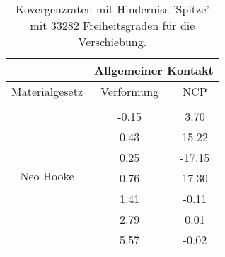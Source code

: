 \begin{table} 
\centering 
\begin{tabular}{c|cc|} 
\cline{2-3} 
 & \multicolumn{2}{|c|}{Allgemeiner Kontakt} \\ 
\hline 
\multicolumn{1}{|c|}{Materialgesetz} & \multicolumn{1}{c|}{Verformung} & \multicolumn{1}{c|}{NCP} \\ 
\hline 
\multicolumn{1}{|c|}{\multirow{8}{*}{Neo Hooke}} &\multicolumn{1}{|c|}{} & \multicolumn{1}{|c|}{} \\ 
\multicolumn{1}{|c|}{} & \multicolumn{1}{|c|}{     -0.15} & \multicolumn{1}{|c|}{      3.70} \\ 
\multicolumn{1}{|c|}{} & \multicolumn{1}{|c|}{      0.43} & \multicolumn{1}{|c|}{     15.22} \\ 
\multicolumn{1}{|c|}{} & \multicolumn{1}{|c|}{      0.25} & \multicolumn{1}{|c|}{    -17.15} \\ 
\multicolumn{1}{|c|}{} & \multicolumn{1}{|c|}{      0.76} & \multicolumn{1}{|c|}{     17.30} \\ 
\multicolumn{1}{|c|}{} & \multicolumn{1}{|c|}{      1.41} & \multicolumn{1}{|c|}{     -0.11} \\ 
\multicolumn{1}{|c|}{} & \multicolumn{1}{|c|}{      2.79} & \multicolumn{1}{|c|}{      0.01} \\ 
\multicolumn{1}{|c|}{} & \multicolumn{1}{|c|}{      5.57} & \multicolumn{1}{|c|}{     -0.02} \\ 
\hline 
\end{tabular}\caption{Kovergenzraten mit Hinderniss 'Spitze' mit 33282 Freiheitsgraden für die Verschiebung.}\label{tab:Rate_Spitze_level6}
\end{table} 
